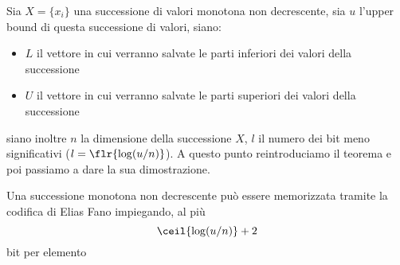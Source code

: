 Sia $X=\{x_i\}$ una successione di valori monotona non decrescente, sia $u$ l'upper bound di questa successione di valori, siano:
\begin{itemize}
	\item $L$ il vettore in cui verranno salvate le parti inferiori dei valori della successione
	\item $U$ il vettore in cui verranno salvate le parti superiori dei valori della successione
\end{itemize}
siano inoltre $n$ la dimensione della successione $X$, $l$ il numero dei bit meno significativi ($l = \flr{\log(u/n)}$). A questo punto reintroduciamo il teorema e poi passiamo a dare la sua dimostrazione.
\begin{theorem}
	Una successione monotona non decrescente può essere memorizzata tramite la codifica di Elias Fano impiegando, al più
	\begin{equation}
		\ceil{\log(u/n)} + 2
	\end{equation}
	bit per elemento
\end{theorem}
